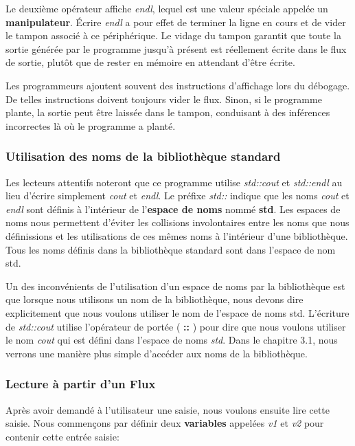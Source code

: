 Le deuxième opérateur affiche \textit{endl}, lequel est une valeur spéciale appelée un \textbf{manipulateur}. Écrire \textit{endl} a pour effet de terminer la ligne en cours et de vider le tampon associé à ce périphérique. Le vidage du tampon garantit que toute la sortie générée par le programme jusqu'à présent est réellement écrite dans le flux de sortie, plutôt que de rester en mémoire en attendant d'être écrite.

\begin{shadebox}
	Les programmeurs ajoutent souvent des instructions d'affichage lors du débogage. De telles instructions doivent toujours vider le flux. Sinon, si le programme plante, la sortie peut être laissée dans le tampon, conduisant à des inférences incorrectes là où le programme a planté.
\end{shadebox}

\subsubsection{Utilisation des noms de la bibliothèque standard}
Les lecteurs attentifs noteront que ce programme utilise \textit{std::cout} et \textit{std::endl} au lieu d'écrire simplement \textit{cout} et \textit{endl}. Le préfixe \textit{std::} indique que les noms \textit{cout} et \textit{endl} sont définis à l'intérieur de l'\textbf{espace de noms} nommé \textbf{std}. Les espaces de noms nous permettent d'éviter les collisions involontaires entre les noms que nous définissions et les utilisations de ces mêmes noms à l'intérieur d'une bibliothèque. Tous les noms définis dans la bibliothèque standard sont dans l'espace de nom std.

Un des inconvénients de l'utilisation d'un espace de noms par la bibliothèque est que lorsque nous utilisons un nom de la bibliothèque, nous devons dire explicitement que nous voulons utiliser le nom de l'espace de noms std. L'écriture de \textit{std::cout} utilise l'opérateur de portée ( \textbf{::} ) pour dire que nous voulons utiliser le nom \textit{cout} qui est défini dans l'espace de noms \textit{std}. Dans le chapitre 3.1, nous verrons une manière plus simple d'accéder aux noms de la bibliothèque.

\subsubsection{Lecture à partir d'un Flux}
Après avoir demandé à l'utilisateur une saisie, nous voulons ensuite lire cette saisie. Nous commençons par définir deux \textbf{variables} appelées \textit{v1} et \textit{v2} pour contenir cette entrée saisie:

